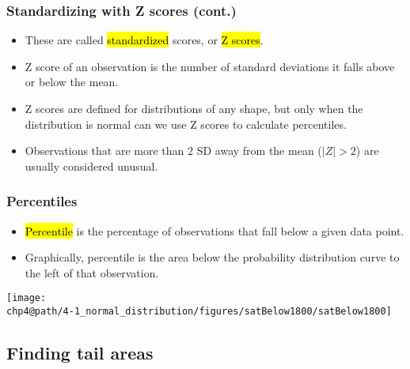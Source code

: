 \documentclass[slidestop,compress,mathserif]{beamer}
\makeatletter
\def\chp4@path{../../Chp 4}
\makeatother
\begin{document}

\begin{frame}
\frametitle{Standardizing with Z scores (cont.)}

\begin{itemize}

\item These are called \hl{standardized} scores, or \hl{Z scores}.

\item Z score of an observation is the number of standard deviations it falls above or below the mean.
\formula{\[Z = \frac{observation - mean}{SD}\]}

\item Z scores are defined for distributions of any shape, but only when the distribution is normal can we use Z scores to calculate percentiles.

\item Observations that are more than 2 SD away from the mean ($|Z| > 2$) are usually considered unusual.

\end{itemize}

\end{frame}


\begin{frame}
\frametitle{Percentiles}

\begin{itemize}

\item \hl{Percentile} is the percentage of observations that fall below a given data point. 

\item Graphically, percentile is the area below the probability distribution curve to the left of that observation.

\end{itemize}

\begin{center}
\texttt{[image: \\chp4@path/4-1\_normal\_distribution/figures/satBelow1800/satBelow1800]}
\end{center}

\end{frame}

\subsection{Finding tail areas}
\end{document}
